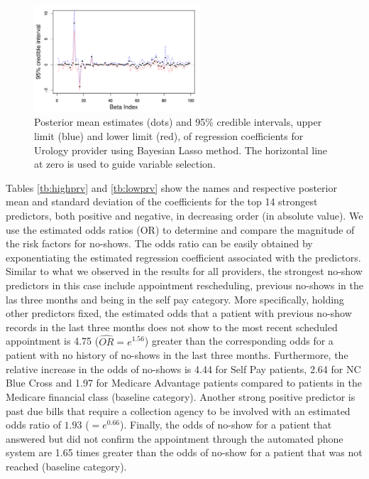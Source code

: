 \documentclass[twoside,11pt]{article}
\begin{document}
\begin{figure}[h]
\begin{center}
\includegraphics[width=0.55\textwidth]{fig2/Prov332-ci}
\caption{ Posterior mean estimates (dots) and 95\% credible intervals, upper limit (blue) and lower limit (red), of regression coefficients for Urology provider using Bayesian Lasso method. The horizontal line at zero is used to guide variable selection.} \label{fig:CI}
\end{center}
\end{figure}

Tables \ref{tb:highprv} and \ref{tb:lowprv} show the names and respective posterior mean and standard deviation of the coefficients for the top 14 strongest predictors, both positive and negative, in decreasing order (in absolute value). We use the estimated odds ratios (OR) to determine and compare the magnitude of the risk factors for no-shows. The odds ratio can be easily obtained by exponentiating the estimated regression coefficient associated with the predictors. Similar to what we observed in the results for all providers, the strongest no-show predictors in this case include appointment rescheduling, previous no-shows in the las three months and being in the self pay category. More specifically, holding other predictors fixed, the estimated odds that a patient with previous no-show records in the last three months does not show to the most recent scheduled appointment is 4.75 ($\hat{OR}=e^{1.56}$) greater than the corresponding odds for a patient with no history of no-shows in the last three months. Furthermore, the relative increase in the odds of no-shows is 4.44 for Self Pay patients, 2.64  for NC Blue Cross and 1.97 for Medicare Advantage patients compared to patients in the Medicare financial class (baseline category). Another strong positive predictor is past due bills that require a collection agency to be involved with an estimated odds ratio of $1.93$ ($=e^{0.66}$). Finally, the odds of no-show for a patient that answered but did not confirm the appointment through the automated phone system are 1.65 times greater than the odds of no-show for a patient that was not reached (baseline category).
\end{document}

